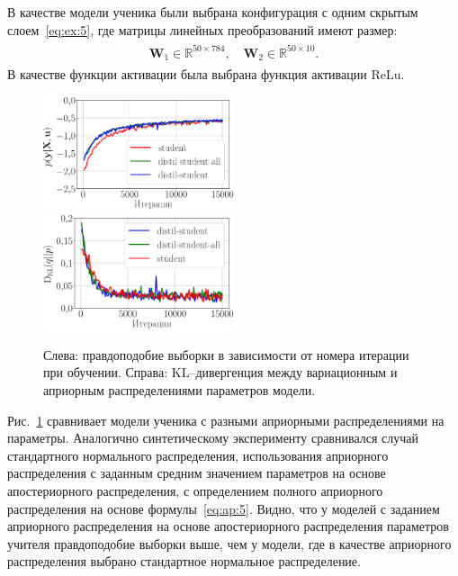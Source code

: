 \documentclass[12pt]{a&t}
\begin{document}
В качестве модели ученика были выбрана конфигурация с одним скрытым слоем~\eqref{eq:ex:5}, где матрицы линейных преобразований имеют размер:
\begin{gather}
\label{eq:ex:7}
\begin{aligned}
\mathbf{W}_{1} \in \mathbb{R}^{50 \times 784}, \quad \mathbf{W}_{2} \in \mathbb{R}^{50 \times 10}.
\end{aligned}
\end{gather}
В качестве функции активации была выбрана функция активации $\text{ReLu}$.

\begin{figure}[h!]
\includegraphics[width=0.5\textwidth]{fashionmnist_likelihood_2_layers.eps}
\includegraphics[width=0.5\textwidth]{fashionmnist_D_KL_2_layers.eps}
\caption{Слева: правдоподобие выборки в зависимости от номера итерации при обучении. Справа: KL--дивергенция между вариационным и априорным распределениями параметров модели.}
\label{exp:fig3}
\end{figure}

Рис.~\ref{exp:fig3} сравнивает модели ученика с разными априорными распределениями на параметры. Аналогично синтетическому эксперименту сравнивался случай стандартного нормального распределения, использования априорного распределения с заданным средним значением параметров на основе апостериорного распределения, с определением полного априорного распределения на основе формулы~\eqref{eq:ap:5}. Видно, что у моделей с заданием априорного распределения на основе апостериорного распределения параметров учителя правдоподобие выборки выше, чем у модели, где в качестве априорного распределения выбрано стандартное нормальное распределение.
\end{document}
